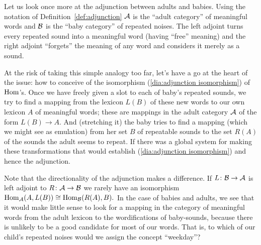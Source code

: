 \documentclass[../main/CT4S-EN-RU]{subfiles}
\begin{document}
\begin{exerciseRUS}\label{ex:monoid adjunction}
\end{exerciseRUS}

\begin{blockENG}
Let us look once more at the adjunction between adults and babies. Using the notation of Definition~\ref{def:adjunction} $\mathcal{A}$ is the “adult category” of meaningful words and $\mathcal{B}$ is the “baby category” of repeated noises. The left adjoint turns every repeated sound into a meaningful word (having “free” meaning) and the right adjoint “forgets” the meaning of any word and considers it merely as a sound. 
\end{blockENG}

\begin{blockRUS}
\end{blockRUS}

\begin{blockENG}
At the risk of taking this simple analogy too far, let's have a go at the heart of the issue: how to conceive of the isomorphism (\ref{dia:adjunction isomorphism}) of $\operatorname{Hom}$'s. Once we have freely given a slot to each of baby's repeated sounds, we try to find a mapping from the lexicon $L(B)$ of these new words to our own lexicon $A$ of meaningful words; these are mappings in the adult category $\mathcal{A}$ of the form $L(B)\to A.$ And (stretching it) the baby tries to find a mapping (which we might see as emulation) from her set $B$ of repeatable sounds to the set $R(A)$ of the sounds the adult seems to repeat. If there was a global system for making these transformations that would establish  (\ref{dia:adjunction isomorphism}) and hence the adjunction.
\end{blockENG}

\begin{blockRUS}
\end{blockRUS}

\begin{blockENG}
Note that the directionality of the adjunction makes a difference. If $L\colon\mathcal{B}\rightarrow\mathcal{A}$ is left adjoint to $R\colon\mathcal{A}\rightarrow\mathcal{B}$ we rarely have an isomorphism $\operatorname{Hom}_\mathcal{A}(A,L(B))\cong\operatorname{Hom}_\mathcal{B}(R(A),B).$ In the case of babies and adults, we see that it would make little sense to look for a mapping in the category of meaningful words from the adult lexicon to the wordifications of baby-sounds, because there is unlikely to be a good candidate for most of our words. That is, to which of our child's repeated noises would we assign the concept “weekday”? 
\end{blockENG}
\end{document}
